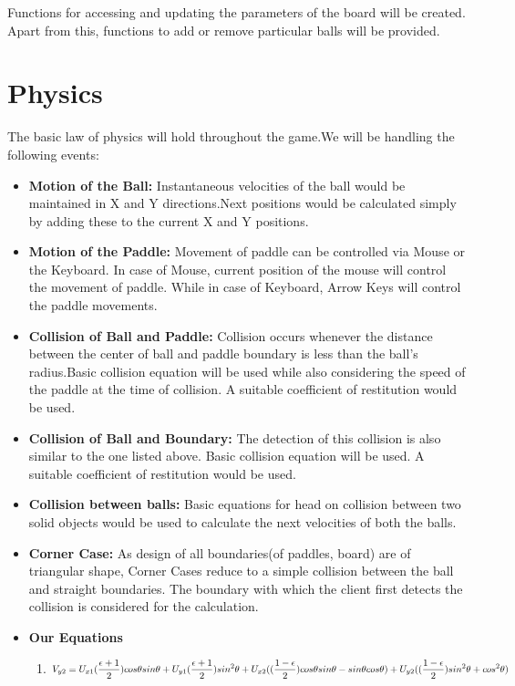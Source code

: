 \documentclass{article}
\begin{document}
Functions for accessing and updating the parameters of the board will be created. Apart from this, functions to add or remove particular balls will be provided.

			\section{Physics} 
			\par\noindent The basic law of physics will hold throughout the game.We will be handling the following events:
			\begin{itemize}
			\item \textbf{Motion of the Ball:} Instantaneous velocities of the ball would be maintained in X and Y directions.Next positions would be calculated simply by adding these to the current X and Y positions. 
			\item \textbf{Motion of the Paddle:} Movement of paddle can be controlled via Mouse or the Keyboard. In case of Mouse, current position of the mouse will control the movement of paddle. While in case of Keyboard, Arrow Keys will control the paddle movements.
			\item \textbf{Collision of Ball and Paddle:} Collision occurs whenever the distance between the center of ball and paddle boundary is less than the ball's radius.Basic collision equation will be used while also considering the speed of the paddle at the time of collision. A suitable coefficient of restitution would be used.
			\item \textbf{Collision of Ball and Boundary:} The detection of this collision is also similar to the one listed above. Basic collision equation will be used. A suitable coefficient of restitution would be used.
			\item \textbf{Collision between balls:} Basic equations for head on collision between two solid objects would be used to calculate the next velocities of both the balls.
			\item \textbf{Corner Case:} As design of all boundaries(of paddles, board) are of triangular shape, Corner Cases reduce to a simple collision between the ball and straight boundaries. The boundary with which the client first detects the collision is considered for the calculation.
			\item \textbf{Our Equations}
			\begin{enumerate}
				\item   \[V_{y2} = U_{x1}(\frac{\epsilon + 1}{2})cos\theta sin\theta + U_{y1}(\frac{\epsilon + 1}{2})sin^2\theta + U_{x2}((\frac{1 - \epsilon}{2})cos\theta sin\theta - sin\theta cos\theta) + \\ U_{y2}((\frac{1 - \epsilon}{2})sin^2\theta + cos^2\theta) \] 


\end{enumerate}
\end{itemize}
\end{document}
